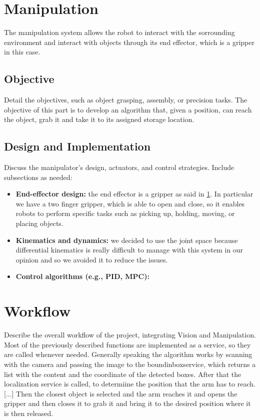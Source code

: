 \documentclass[12pt,a4paper]{article}
\begin{document}
\section{Manipulation}\label{sec:manipulation}
The manipulation system allows the robot to interact with the sorrounding environment and interact with objects through its end effector, which is a gripper in this case.

\subsection{Objective}\label{subsec:mobj}
Detail the objectives, such as object grasping, assembly, or precision tasks.
The objective of this part is to develop an algorithm that, given a position, can reach the object, grab it and take it to its assigned storage location.

\subsection{Design and Implementation}\label{susec:design}
Discuss the manipulator's design, actuators, and control strategies. Include subsections as needed:
\begin{itemize}
    \item \textbf{End-effector design:} the end effector is a gripper as said in \ref{sec:manipulation}. In particular we have a two finger gripper, which is able to open and close, so it enables robots to perform specific tasks such as picking up, holding, moving, or placing objects. 
    \item \textbf{Kinematics and dynamics:} we decided to use the joint space because differential kinematics is really difficult to manage with this system in our opinion and so we avoided it to reduce the issues.
    \item \textbf{Control algorithms (e.g., PID, MPC):}
\end{itemize}



\section{Workflow}\label{sec:workflow}
Describe the overall workflow of the project, integrating Vision and Manipulation. Most of the previously described functions are implemented as a service, so they are called whenever needed. Generally speaking the algorithm works by scanning with the camera and passing the image to the boundinboxservice, which returns a list with the content and the coordinate of the detected boxes. After that the localization service is called, to determiine the position that the arm has to reach. [...] Then the closest object is selected and the arm reaches it and opens the gripper and then closes it to grab it and bring it to the desired position where it is then released.
\end{document}

